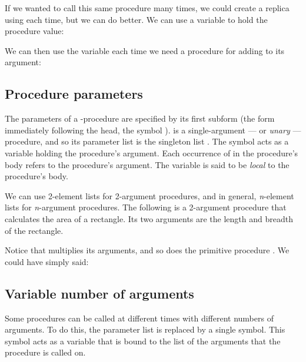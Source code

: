 
If we wanted to call this same procedure many times, we
could create a replica using  each time, but
we can do better.   We can use a variable to hold the
procedure value:


We can then use the variable  each time we need
a procedure for adding  to its argument:


\subsection{Procedure parameters}

The parameters of a -procedure are specified
by its first subform (the form immediately following
the head, the symbol ).  
is a single-argument — or {\em unary} — procedure, and so its parameter
list is the singleton list .  The symbol 
acts as a variable holding the procedure’s argument.
Each occurrence of  in the procedure’s body refers
to the procedure’s argument.  The variable  is
said to be {\em local} to the procedure’s body.

We can use 2-element lists for 2-argument procedures,
and in general, {\em n}-element lists for {\em
n}-argument procedures.  The following is a 2-argument
procedure that calculates the area of a rectangle.  Its
two arguments are the length and breadth of the
rectangle.


Notice that  multiplies its arguments, and so
does the primitive procedure \q{*}.  We could have
simply said:


\subsection{Variable number of arguments}

Some procedures can be called at different times with
different numbers of arguments.  To do this, the
 parameter list is replaced by a single
symbol.  This symbol acts as a variable that is bound
to the list of the arguments that the procedure is
called on.

